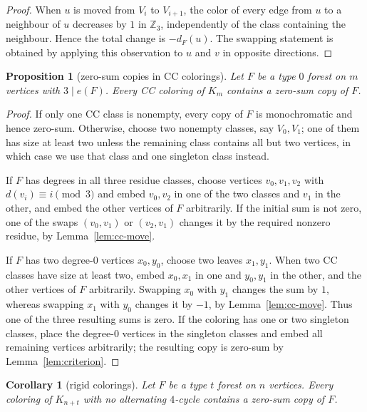 \documentclass[11pt]{article}
\newtheorem{proposition}[theorem]{Proposition}
\newtheorem{corollary}[theorem]{Corollary}
\newcommand{\Z}{\mathbb Z}
\begin{document}
\begin{proof}
When $u$ is moved from $V_i$ to $V_{i+1}$, the color of every edge from $u$ to a neighbour of $u$ decreases by $1$ in $\Z_3$, independently of the class containing the neighbour.  Hence the total change is $-d_F(u)$.  The swapping statement is obtained by applying this observation to $u$ and $v$ in opposite directions.
\end{proof}

\begin{proposition}[zero-sum copies in CC colorings]\label{prop:cc-copy}
Let $F$ be a type $0$ forest on $m$ vertices with $3\mid e(F)$. Every CC coloring of $K_m$ contains a zero-sum copy of $F$.
\end{proposition}

\begin{proof}
 If only one CC class is nonempty, every copy of $F$ is monochromatic and hence zero-sum.  Otherwise, choose two nonempty classes, say $V_0,V_1$; one of them has size at least two unless the remaining class contains all but two vertices, in which case we use that class and one singleton class instead.

If $F$ has degrees in all three residue classes, choose vertices $v_0,v_1,v_2$ with $d(v_i)\equiv i\pmod 3$ and embed $v_0,v_2$ in one of the two classes and $v_1$ in the other, and embed the other vertices of $F$ arbitrarily.  If the initial sum is not zero, one of the swaps $(v_0,v_1)$ or $(v_2,v_1)$ changes it by the required nonzero residue, by Lemma~\ref{lem:cc-move}.

If $F$ has two degree-$0$ vertices $x_0,y_0$, choose two leaves $x_1,y_1$.  When two CC classes have size at least two, embed $x_0,x_1$ in one and $y_0,y_1$ in the other, and the other vertices of $F$ arbitrarily. Swapping $x_0$ with $y_1$ changes the sum by $1$, whereas
swapping $x_1$ with $y_0$ changes it by $-1$, by
Lemma~\ref{lem:cc-move}. Thus one of the three resulting sums is zero.  If the coloring has one or two singleton classes, place the degree-$0$ vertices in the singleton classes and embed all remaining vertices arbitrarily; the resulting copy is zero-sum by Lemma~\ref{lem:criterion}.
\end{proof}

\begin{corollary}[rigid colorings]\label{cor:no-alt-upper}
Let $F$ be a type $t$ forest on $n$ vertices.  Every coloring of $K_{n+t}$ with no alternating $4$-cycle contains a zero-sum copy of $F$.
\end{corollary}
\end{document}
